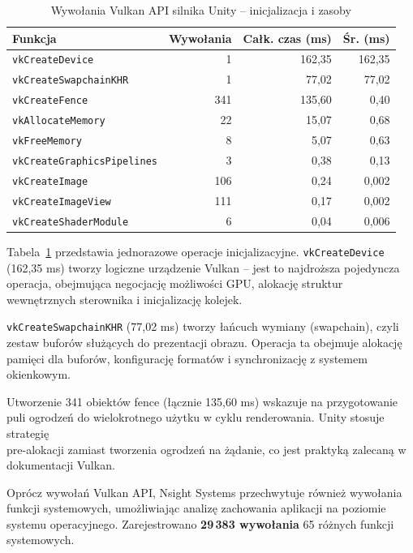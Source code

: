 \begin{table}[H]
\centering
\caption{Wywołania Vulkan API silnika Unity -- inicjalizacja i zasoby}
\label{tab:unity-vulkan-init}
\begin{tabular}{|l|r|r|r|}
\hline
\textbf{Funkcja} & \textbf{Wywołania} & \textbf{Całk. czas (ms)} & \textbf{Śr. (ms)} \\
\hline
\texttt{vkCreateDevice} & 1 & 162,35 & 162,35 \\
\texttt{vkCreateSwapchainKHR} & 1 & 77,02 & 77,02 \\
\texttt{vkCreateFence} & 341 & 135,60 & 0,40 \\
\texttt{vkAllocateMemory} & 22 & 15,07 & 0,68 \\
\texttt{vkFreeMemory} & 8 & 5,07 & 0,63 \\
\texttt{vkCreateGraphicsPipelines} & 3 & 0,38 & 0,13 \\
\texttt{vkCreateImage} & 106 & 0,24 & 0,002 \\
\texttt{vkCreateImageView} & 111 & 0,17 & 0,002 \\
\texttt{vkCreateShaderModule} & 6 & 0,04 & 0,006 \\
\hline
\end{tabular}
\end{table}


Tabela~\ref{tab:unity-vulkan-init} przedstawia jednorazowe operacje inicjalizacyjne. \texttt{vkCreateDevice} (162,35 ms) tworzy logiczne 
urządzenie Vulkan -- jest to najdroższa pojedyncza operacja, obejmująca negocjację możliwości GPU, alokację struktur wewnętrznych sterownika i 
inicjalizację kolejek.

\texttt{vkCreateSwapchainKHR} (77,02 ms) tworzy łańcuch wymiany (swapchain), czyli zestaw 
buforów służących do prezentacji obrazu. Operacja ta 
obejmuje alokację pamięci dla buforów, konfigurację formatów i synchronizację z systemem okienkowym.

Utworzenie 341 obiektów fence (łącznie 135,60 ms) wskazuje na 
przygotowanie puli ogrodzeń do wielokrotnego użytku w cyklu renderowania. 
Unity stosuje 
strategię \\ pre-alokacji zamiast tworzenia ogrodzeń na żądanie, co 
jest praktyką zalecaną w dokumentacji 
Vulkan.


Oprócz wywołań Vulkan API, Nsight Systems przechwytuje również wywołania funkcji systemowych, umożliwiając analizę zachowania aplikacji na poziomie 
systemu operacyjnego. Zarejestrowano \textbf{29\,383 wywołania} 65 różnych funkcji systemowych.

